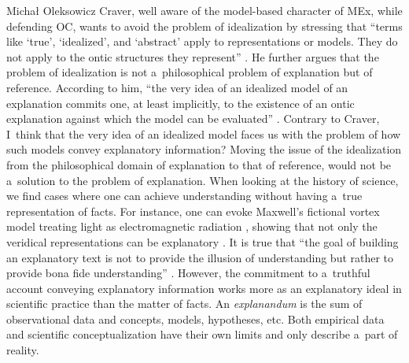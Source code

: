 \begin{artengenv}{Michał Oleksowicz}
Craver, well aware of the model-based character of MEx, while defending OC, wants to avoid the problem of idealization by stressing that ``terms like ‘true', ‘idealized', and ‘abstract' apply to representations or models. They do not apply to the ontic structures they represent''
\parencite[][p.50]{kaiser_ontic_2014}. %
 He further argues that the problem of idealization is not a~philosophical problem of explanation but of reference. According to him, ``the very idea of an idealized model of an explanation commits one, at least implicitly, to the existence of an ontic explanation against which the model can be evaluated'' 
\parencite[][p.50]{kaiser_ontic_2014}. %
 Contrary to Craver, I~think that the very idea of an idealized model faces us with the problem of how such models convey explanatory information? Moving the issue of the idealization from the philosophical domain of explanation to that of reference, would not be a~solution to the problem of explanation. When looking at the history of science, we find cases where one can achieve understanding without having a~true representation of facts. For instance, one can evoke Maxwell's fictional vortex model treating light as electromagnetic radiation 
\parencite[][]{de_regt_scientific_2015}, %
 showing that not only the veridical representations can be explanatory 
\parencite[][]{bokulich_fiction_2016}. %
 It is true that ``the goal of building an explanatory text is not to provide the illusion of understanding but rather to provide bona fide understanding'' 
\parencite[][p.49]{kaiser_ontic_2014}. %
 However, the commitment to a~truthful account conveying explanatory information works more as an explanatory ideal in scientific practice than the matter of facts. An \textit{explanandum} is the sum of observational data and concepts, models, hypotheses, etc. Both empirical data and scientific conceptualization have their own limits and only describe a~part of reality.


\end{artengenv}
